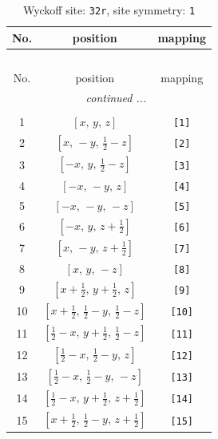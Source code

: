 \documentclass[fleqn,8pt]{jsarticle}
\begin{document}
\renewcommand{\arraystretch}{1.2}
\begin{longtable}{ccc}
\caption{Wyckoff site: {\tt 32r}, site symmetry: {\tt 1}}
 \\
 \hline \hline
No. & position & mapping \\ \hline \endfirsthead

\multicolumn{2}{l}{\tablename\ \thetable{}} \\
 \hline \hline
No. & position & mapping \\ \hline \endhead

 \hline \hline
\multicolumn{2}{r}{\footnotesize\it continued ...} \\ \endfoot

 \hline \hline
\multicolumn{2}{r}{} \\ \endlastfoot

1 & $\left[ x,\, y,\, z \right]$ & {\tt [1]} \\ \hline
2 & $\left[ x,\, - y,\, \frac{1}{2} - z \right]$ & {\tt [2]} \\ \hline
3 & $\left[ - x,\, y,\, \frac{1}{2} - z \right]$ & {\tt [3]} \\ \hline
4 & $\left[ - x,\, - y,\, z \right]$ & {\tt [4]} \\ \hline
5 & $\left[ - x,\, - y,\, - z \right]$ & {\tt [5]} \\ \hline
6 & $\left[ - x,\, y,\, z + \frac{1}{2} \right]$ & {\tt [6]} \\ \hline
7 & $\left[ x,\, - y,\, z + \frac{1}{2} \right]$ & {\tt [7]} \\ \hline
8 & $\left[ x,\, y,\, - z \right]$ & {\tt [8]} \\ \hline
9 & $\left[ x + \frac{1}{2},\, y + \frac{1}{2},\, z \right]$ & {\tt [9]} \\ \hline
10 & $\left[ x + \frac{1}{2},\, \frac{1}{2} - y,\, \frac{1}{2} - z \right]$ & {\tt [10]} \\ \hline
11 & $\left[ \frac{1}{2} - x,\, y + \frac{1}{2},\, \frac{1}{2} - z \right]$ & {\tt [11]} \\ \hline
12 & $\left[ \frac{1}{2} - x,\, \frac{1}{2} - y,\, z \right]$ & {\tt [12]} \\ \hline
13 & $\left[ \frac{1}{2} - x,\, \frac{1}{2} - y,\, - z \right]$ & {\tt [13]} \\ \hline
14 & $\left[ \frac{1}{2} - x,\, y + \frac{1}{2},\, z + \frac{1}{2} \right]$ & {\tt [14]} \\ \hline
15 & $\left[ x + \frac{1}{2},\, \frac{1}{2} - y,\, z + \frac{1}{2} \right]$ & {\tt [15]} \\ \hline

\end{longtable}
\end{document}

